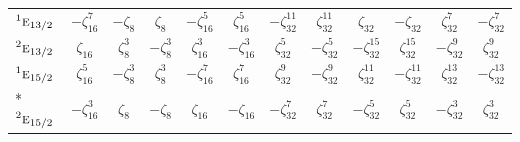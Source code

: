 \documentclass[10pt,a4paper]{article}
\numberwithin{equation}{section}
\newcommand{\irr}[1]{\text{\normalfont\scshape #1}}
\newcommand{\conjpair}[1]{{}^{#1}}
\newcommand{\rootunity}[1]{\zeta_{#1}}
\begin{document}
{\begin{longtable}{@{}lccccccccccc@{}}
$\conjpair{1}\irr{e}_{13/2}$ & $-\rootunity{16}^{7}$ & $-\rootunity{8}$ & $\rootunity{8}$ & $-\rootunity{16}^{5}$ & $\rootunity{16}^{5}$ & $-\rootunity{32}^{11}$ & $\rootunity{32}^{11}$ & $\rootunity{32}$ & $-\rootunity{32}$ & $\rootunity{32}^{7}$ & $-\rootunity{32}^{7}$\\
$\conjpair{2}\irr{e}_{13/2}$ & $\rootunity{16}$ & $\rootunity{8}^{3}$ & $-\rootunity{8}^{3}$ & $\rootunity{16}^{3}$ & $-\rootunity{16}^{3}$ & $\rootunity{32}^{5}$ & $-\rootunity{32}^{5}$ & $-\rootunity{32}^{15}$ & $\rootunity{32}^{15}$ & $-\rootunity{32}^{9}$ & $\rootunity{32}^{9}$\\
$\conjpair{1}\irr{e}_{15/2}$ & $\rootunity{16}^{5}$ & $-\rootunity{8}^{3}$ & $\rootunity{8}^{3}$ & $-\rootunity{16}^{7}$ & $\rootunity{16}^{7}$ & $\rootunity{32}^{9}$ & $-\rootunity{32}^{9}$ & $\rootunity{32}^{11}$ & $-\rootunity{32}^{11}$ & $\rootunity{32}^{13}$ & $-\rootunity{32}^{13}$\\*
$\conjpair{2}\irr{e}_{15/2}$ & $-\rootunity{16}^{3}$ & $\rootunity{8}$ & $-\rootunity{8}$ & $\rootunity{16}$ & $-\rootunity{16}$ & $-\rootunity{32}^{7}$ & $\rootunity{32}^{7}$ & $-\rootunity{32}^{5}$ & $\rootunity{32}^{5}$ & $-\rootunity{32}^{3}$ & $\rootunity{32}^{3}$\\
\bottomrule\end{longtable}}
\end{document}

